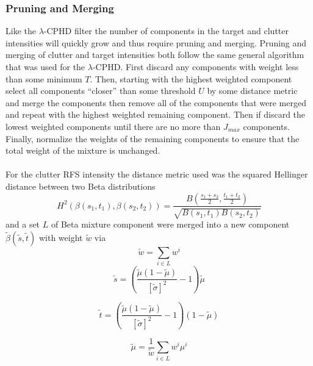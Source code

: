 \documentclass{article}
\begin{document}
\subsubsection*{Pruning and Merging}
Like the $\lambda$-CPHD filter the number of components in the target and clutter intensities will quickly grow and thus require pruning and merging. Pruning and merging of clutter and target intensities both follow the same general algorithm that was used for the $\lambda$-CPHD. First discard any components with weight less than some minimum $T$. Then, starting with the highest weighted component select all components ``closer'' than some threshold $U$ by some distance metric and merge the components then remove all of the components that were merged and repeat with the highest weighted remaining component. Then if discard the lowest weighted components until there are no more than $J_{max}$ components. Finally, normalize the weights of the remaining components to ensure that the total weight of the mixture is unchanged.\\
\\
For the clutter RFS intensity the distance metric used was the squared Hellinger distance between two Beta distributions
\begin{equation}
  \label{eq:hellinger_beta}
  H^2\left( \beta(s_1,t_1),\beta(s_2,t_2)\right) = \frac{B\left( \frac{s_1+s_2}{2},\frac{t_1+t_2}{2}\right)}{\sqrt{B(s_1,t_1)B(s_2,t_2)}}
\end{equation}
and a set $L$ of Beta mixture component were merged into a new component $\tilde{\beta}(\tilde{s},\tilde{t})$ with weight $\tilde{w}$ via
\begin{equation}
  \label{eq:beta_merge_w}
  \tilde{w} = \sum_{i \in L}w^i
\end{equation}
\begin{equation}
  \label{eq:beta_merge_s}
  \tilde{s} = \left( \frac{ \tilde{\mu} \left( 1 - \tilde{\mu} \right) }
    { \left[ \tilde{\sigma} \right]^2  } -1 \right)  \tilde{\mu}
\end{equation}

\begin{equation}
  \label{eq:beta_merge_t}
  \tilde{t} = \left( \frac{ \tilde{\mu} \left( 1 - \tilde{\mu} \right) }
    { \left[ \tilde{\sigma} \right]^2  } -1 \right)  \left( 1-\tilde{\mu} \right)
\end{equation}

\begin{equation}
  \label{eq:beta_mu_merge}
  \tilde{\mu} = \frac{ 1 }{\tilde{w}}\sum_{i \in L}w^i\mu^i
\end{equation}
\end{document}
